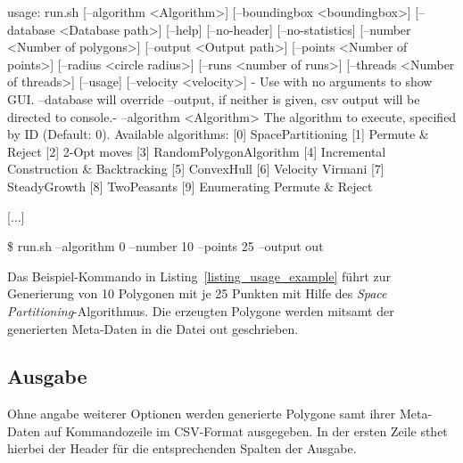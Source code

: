 \begin{code}[caption={Usage der Kommandozeile},label=listing_usage]
usage: run.sh [--algorithm <Algorithm>] [--boundingbox <boundingbox>]
       [--database <Database path>] [--help] [--no-header]
       [--no-statistics] [--number <Number of polygons>] [--output <Output
       path>] [--points <Number of points>] [--radius <circle radius>]
       [--runs <number of runs>] [--threads <Number of threads>] [--usage]
       [--velocity <velocity>]
-
Use with no arguments to show GUI.
--database will override --output, if neither is given, csv output will be
directed to console.-
    --algorithm <Algorithm>         The algorithm to execute, specified by
                                    ID (Default: 0). Available algorithms:
                                    [0] SpacePartitioning
                                    [1] Permute & Reject
                                    [2] 2-Opt moves
                                    [3] RandomPolygonAlgorithm
                                    [4] Incremental Construction &
                                    Backtracking
                                    [5] ConvexHull
                                    [6] Velocity Virmani
                                    [7] SteadyGrowth
                                    [8] TwoPeasants
                                    [9] Enumerating Permute & Reject

[...]
\end{code}

\begin{code}[caption={Beispiel-Ausführung},label=listing_usage_example]
\$ run.sh --algorithm 0 --number 10 --points 25 --output out
\end{code}

    Das Beispiel-Kommando in Listing~\ref{listing_usage_example} führt zur
    Generierung von 10 Polygonen mit je 25 Punkten mit Hilfe des \emph{Space
    Partitioning}-Algorithmus. Die erzeugten Polygone werden mitsamt der
    generierten Meta-Daten in die Datei out geschrieben.

  \subsection{Ausgabe}
    Ohne angabe weiterer Optionen werden generierte Polygone samt ihrer
    Meta-Daten auf Kommandozeile im CSV-Format ausgegeben. In der ersten Zeile
    sthet hierbei der Header für die entsprechenden Spalten der Ausgabe.

